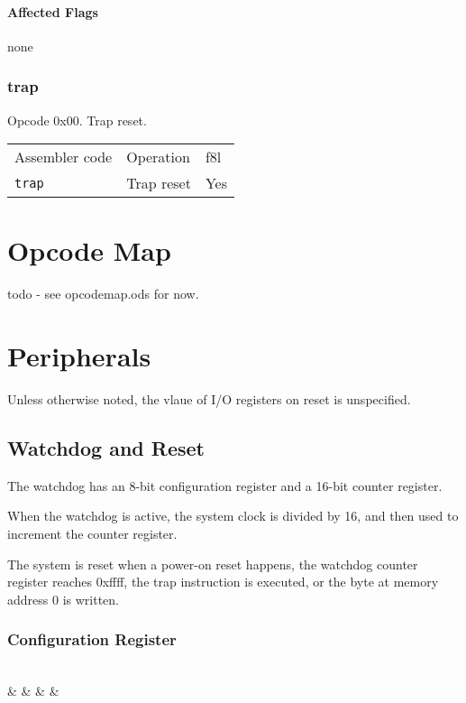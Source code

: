 \documentclass{book}
\begin{document}
\subsubsection*{Affected Flags}

none


\subsection{trap}

Opcode 0x00. Trap reset.

\begin{tabular}{l l l}
Assembler code  & Operation  & f8l \\
\texttt{trap}   & Trap reset & Yes \\
\end{tabular}


\chapter{Opcode Map}

todo - see opcodemap.ods for now.

\chapter{Peripherals}

Unless otherwise noted, the vlaue of I/O registers on reset is unspecified.

\section{Watchdog and Reset}

The watchdog has an 8-bit configuration register and a 16-bit counter register.

When the watchdog is active, the system clock is divided by 16, and then used to increment the counter register.

The system is reset when a power-on reset happens, the watchdog counter register reaches 0xffff, the trap instruction is executed, or the byte at memory address 0 is written.

\subsection*{Configuration Register}

\vspace{3mm}
\begin{bytefield}[bitwidth=0.13\linewidth]{8}
	 \\
	 &  &  &  & 
\end{bytefield}
\end{document}
